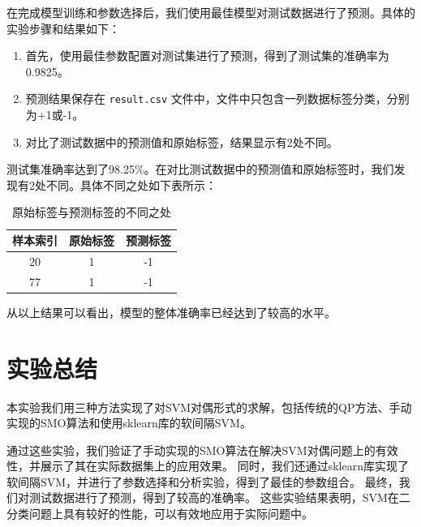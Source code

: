 \documentclass[12pt]{article}
\begin{document}
在完成模型训练和参数选择后，我们使用最佳模型对测试数据进行了预测。具体的实验步骤和结果如下：

\begin{enumerate}
  \item 首先，使用最佳参数配置对测试集进行了预测，得到了测试集的准确率为0.9825。
  \item 预测结果保存在 \texttt{result.csv} 文件中，文件中只包含一列数据标签分类，分别为+1或-1。
  \item 对比了测试数据中的预测值和原始标签，结果显示有2处不同。
\end{enumerate}




测试集准确率达到了98.25\%。在对比测试数据中的预测值和原始标签时，我们发现有2处不同。具体不同之处如下表所示：

\begin{table}[h]
  \centering
  \begin{tabular}{ccc}
    \toprule
    样本索引 & 原始标签 & 预测标签 \\
    \midrule
    20   & 1    & -1   \\
    77   & 1    & -1   \\
    \bottomrule
  \end{tabular}
  \caption{原始标签与预测标签的不同之处}
\end{table}

从以上结果可以看出，模型的整体准确率已经达到了较高的水平。

\section{实验总结}
本实验我们用三种方法实现了对SVM对偶形式的求解，包括传统的QP方法、手动实现的SMO算法和使用sklearn库的软间隔SVM。

通过这些实验，我们验证了手动实现的SMO算法在解决SVM对偶问题上的有效性，并展示了其在实际数据集上的应用效果。
同时，我们还通过sklearn库实现了软间隔SVM，并进行了参数选择和分析实验，得到了最佳的参数组合。
最终，我们对测试数据进行了预测，得到了较高的准确率。
这些实验结果表明，SVM在二分类问题上具有较好的性能，可以有效地应用于实际问题中。
\end{document}
